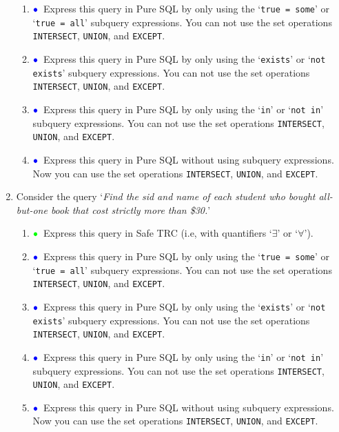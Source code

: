 \documentclass[11pt]{article}
\newcommand{\green}[1]{{\color{green}#1}}
\newcommand{\blue}[1]{{\color{blue}#1}}
\newcommand{\greenbullet}{$\green{\bullet}$}
\newcommand{\bluebullet}{$\blue{\bullet}$}
\begin{document}
\begin{enumerate}[resume]
\begin{enumerate}
     \item \bluebullet\ Express this query in Pure SQL by only using the `{\tt true = some}' or `{\tt true = all}' subquery expressions.
    You can not use the set operations {\tt INTERSECT}, {\tt UNION}, and {\tt EXCEPT}.
    
    \item  \bluebullet\  Express this query in Pure SQL by only using the `{\tt exists}' or `{\tt not exists}' subquery expressions.
    You can not use the set operations {\tt INTERSECT}, {\tt UNION}, and {\tt EXCEPT}.
    
   \item  \bluebullet\  Express this query in Pure SQL by only using the `{\tt in}' or `{\tt not in}' subquery expressions.
    You can not use the set operations {\tt INTERSECT}, {\tt UNION}, and {\tt EXCEPT}.
     
     
    \item    \bluebullet\  Express this query in Pure SQL without using subquery expressions.
    Now you can use the set operations {\tt INTERSECT}, {\tt UNION}, and {\tt EXCEPT}.
    \end{enumerate}


\item \label{queryFive} Consider the query `\emph{Find the sid and name of each student who bought all-but-one book that cost strictly more than \$30.}'

    \begin{enumerate}
    \item \greenbullet\  Express this query in Safe TRC (i.e, with quantifiers `$\exists$' or `$\forall$').
   
    
    \item \bluebullet\ Express this query in Pure SQL by only using the `{\tt true = some}' or `{\tt true = all}' subquery expressions.
    You can not use the set operations {\tt INTERSECT}, {\tt UNION}, and {\tt EXCEPT}.
    
    \item  \bluebullet\  Express this query in Pure SQL by only using the `{\tt exists}'  or `{\tt not exists}' subquery expressions.
    You can not use the set operations {\tt INTERSECT}, {\tt UNION}, and {\tt EXCEPT}.

    
    \item  \bluebullet\  Express this query in Pure SQL by only using the `{\tt in}' or `{\tt not in}' subquery expressions.
    You can not use the set operations {\tt INTERSECT}, {\tt UNION}, and {\tt EXCEPT}.
    
    \item    \bluebullet\  Express this query in Pure SQL without using subquery expressions.
    Now you can use the set operations {\tt INTERSECT}, {\tt UNION}, and {\tt EXCEPT}.
    \end{enumerate}


\end{enumerate}
\end{document}
